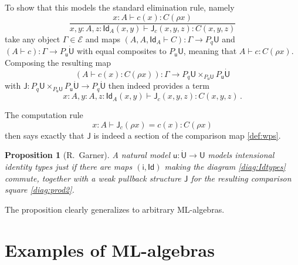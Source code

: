 \documentclass[12pt,reqno]{amsart}
\newcommand{\ednote}[1]{[\textit{\color{red}{#1}}]} %
\newcommand{\EE}{\ensuremath{\mathcal{E}}}
\renewcommand{\to}{\ensuremath{\rightarrow}}
\newcommand{\Id}{\mathsf{Id}}
\renewcommand{\t}{\ensuremath{\mathsf{u}}}
\newcommand{\T}{\ensuremath{\mathsf{U}}}
\newcommand{\TT}{\ensuremath{\dot{\mathsf{U}}}}
\newtheorem{proposition}[theorem]{Proposition}
\theoremstyle{remark}
\theoremstyle{definition}
\begin{document}
To show that this models the standard elimination rule, namely
\[
\frac{x:A\vdash c(x) : C(\rho x)}{x, y:A, z : \Id_A(x, y)\vdash \mathsf{J}_c(x,y,z) : C(x,y,z)}
\]
take any object $\Gamma \in \EE$  and maps $(A, A, \Id_{A} \vdash C) : \Gamma \to P_q\T$ and $(A \vdash c) : \Gamma \to P_\t\TT$ with equal composites to $P_\t\T$, meaning that $A \vdash c : C(\rho x)$.  Composing the resulting map 
\[
(A\vdash c(x):C(\rho x)) : \Gamma \to P_q\T \times_{P_\t\T} P_\t\TT
\]
with $\mathsf{J} : P_q\T \times_{P_\t\T} P_\t\TT \to P_q \TT$ then indeed provides a term $$x:A, y:A, z:\Id_{A}(x,y)  \vdash \mathsf{J}_c(x,y,z) : C(x,y,z)\,.$$

The computation rule
\[
x: A \vdash \mathsf{J}_c(\rho x) = c(x) : C(\rho x)
\]
then says exactly that $\mathsf{J}$ is indeed a section of the comparison map \eqref{def:wps}.

\begin{proposition}[R.\ Garner]\label{prop:Id-typesfromML} A natural model $\t : \TT \to \T$ models intensional \emph{identity types} just if there are maps $(\mathsf{i}, \Id)$ making the diagram \eqref{diag:Idtypes} commute, together with a weak pullback structure $\mathsf{J}$ for the resulting comparison square \eqref{diag:prod2}.
\end{proposition}

The proposition clearly generalizes to arbitrary ML-algebras.

\section{Examples of ML-algebras}\label{sec:ExamplesML-Algebras}
\end{document}
